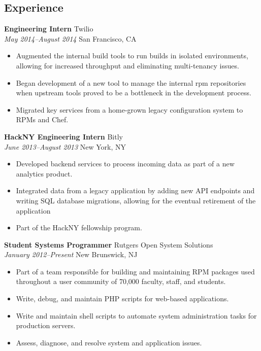 \documentclass[centered,overlapped]{res}
\begin{document}
\author{Joshua Matthews}

\address{153 Riveredge Road \\ Tinton Falls, NJ 07724}
\address{josh@jmatthews.us \\ github.com/jmatth}

\begin{resume}

\section{Experience}

{\bf Engineering Intern} \hfill Twilio\\
\textit{May 2014--August 2014} \hfill San Francisco, CA
\begin{itemize} \itemsep -2pt %
    \item Augmented the internal build tools to run builds in isolated
      environments, allowing for increased throughput and eliminating
      multi-tenancy issues.
    \item Began development of a new tool to manage the internal rpm
      repositories when upstream tools proved to be a bottleneck in the
      development process.
    \item Migrated key services from a home-grown legacy configuration
        system to RPMs and Chef.
\end{itemize}

{\bf HackNY Engineering Intern} \hfill Bitly\\
\textit{June 2013--August 2013} \hfill New York, NY
\begin{itemize} \itemsep -2pt %
    \item Developed backend services to process incoming data as part of a new
      analytics product.
    \item Integrated data from a legacy application by adding new API endpoints
      and writing SQL database migrations, allowing for the eventual retirement
      of the application
    \item Part of the HackNY fellowship program.
\end{itemize}

{\bf Student Systems Programmer} \hfill Rutgers Open System Solutions\\
\textit{January 2012--Present} \hfill New Brunswick, NJ
\begin{itemize} \itemsep -2pt %
	\item Part of a team responsible for building and maintaining RPM packages
    used throughout a user community of 70,000 faculty, staff, and students.
	\item Write, debug, and maintain PHP scripts for web-based applications.
  \item Write and maintain shell scripts to automate system administration tasks
    for production servers.
	\item Assess, diagnose, and resolve system and application issues.
\end{itemize}



\end{resume}
\end{document}
